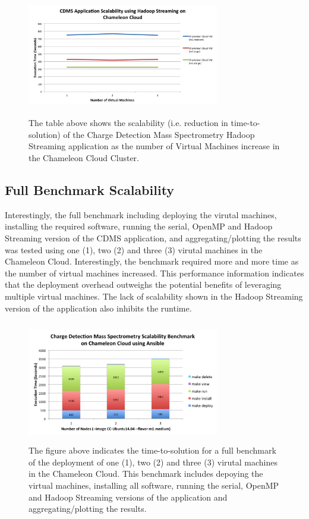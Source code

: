 \documentclass[9pt,twocolumn,twoside]{../../styles/osajnl}
\begin{document}
\begin{figure}[h]
\centering
\includegraphics[height=2.1in, width=3.3in]{images/hadoop_benchmark}
\caption{The table above shows the scalability (i.e. reduction in
  time-to-solution) of the Charge Detection Mass Spectrometry Hadoop
  Streaming application as the number of Virtual Machines increase in
  the Chameleon Cloud Cluster.}
\label{fig:benchmark}
\end{figure}

\subsection{Full Benchmark Scalability} 
Interestingly, the full benchmark including deploying the virutal
machines, installing the required software, running the serial, OpenMP
and Hadoop Streaming version of the CDMS application, and
aggregating/plotting the results was tested using one (1), two (2) and
three (3) virutal machines in the Chameleon Cloud. Interestingly, the
benchmark required more and more time as the number of virtual
machines increased. This performance information indicates that the
deployment overhead outweighs the potential benefits of leveraging
multiple virtual machines. The lack of scalability shown in the Hadoop
Streaming version of the application also inhibits the runtime.
\begin{figure}[h]
\centering
\includegraphics[height=2.1in, width=3.3in]{images/benchmark}
\caption{The figure above indicates the time-to-solution for a full
  benchmark of the deployment of one (1), two (2) and three (3)
  virutal machines in the Chameleon Cloud. This benchmark includes
  depoying the virtual machines, installing all software, running the
  serial, OpenMP and Hadoop Streaming versions of the application and
  aggregating/plotting the results.}
\label{fig:benchmark}
\end{figure}
\end{document}
